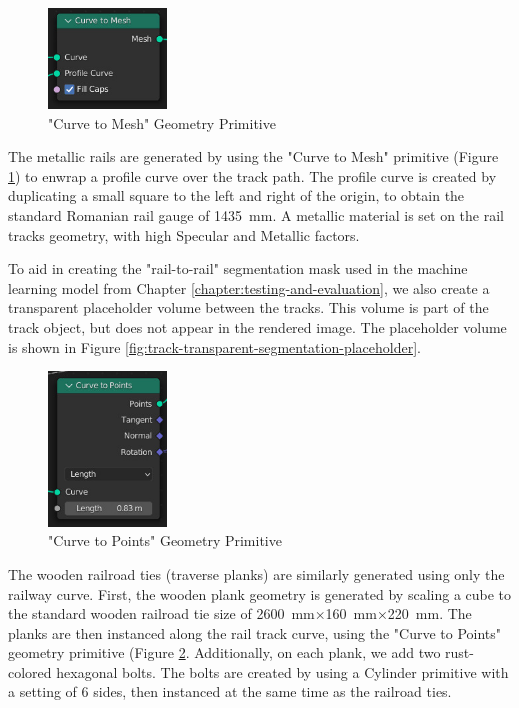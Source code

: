 \begin{figure}
    \centering
    \includegraphics[width=0.28\textwidth]{src/img/procedural-tracks/3a-rails-curve-to-mesh.jpg}
    \caption{"Curve to Mesh" Geometry Primitive}
    \label{fig:track-curve-to-mesh-primitive}
\end{figure}


The metallic rails are generated by using the "Curve to Mesh" primitive (Figure \ref{fig:track-curve-to-mesh-primitive}) to enwrap a profile curve over the track path. The profile curve is created by duplicating a small square to the left and right of the origin, to obtain the standard Romanian rail gauge of 1435 mm. A metallic material is set on the rail tracks geometry, with high Specular and Metallic factors.

To aid in creating the "rail-to-rail" segmentation mask used in the machine learning model from Chapter \ref{chapter:testing-and-evaluation}, we also create a transparent placeholder volume between the tracks. This volume is part of the track object, but does not appear in the rendered image. The placeholder volume is shown in Figure \ref{fig:track-transparent-segmentation-placeholder}.

\begin{figure}
    \centering
    \includegraphics[width=0.28\textwidth]{src/img/procedural-tracks/2c-planks-curve-to-points.jpg}
     \caption{"Curve to Points" Geometry Primitive}
     \label{fig:curve-to-points}
\end{figure}

The wooden railroad ties (traverse planks) are similarly generated using only the railway curve. First, the wooden plank geometry is generated by scaling a cube to the standard wooden railroad tie size of 2600 mm×160 mm×220 mm. The planks are then instanced along the rail track curve, using the "Curve to Points" geometry primitive (Figure \ref{fig:curve-to-points}. Additionally, on each plank, we add two rust-colored hexagonal bolts. The bolts are created by using a Cylinder primitive with a setting of 6 sides, then instanced at the same time as the railroad ties.

